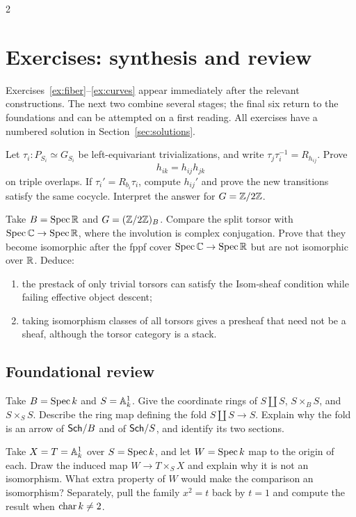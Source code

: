 \documentclass[12pt]{memoir}
\begin{document}
\begin{multicols}{2}
\section{Exercises: synthesis and review}\label{sec:exercises}

Exercises~\ref{ex:fiber}--\ref{ex:curves} appear immediately after the
relevant constructions. The next two combine several stages; the final
six return to the foundations and can be attempted on a first reading.
All exercises have a numbered solution in Section~\ref{sec:solutions}.

\begin{Ej}\label{ex:change}
Let $\tau_i:P_{S_i}\simeq G_{S_i}$ be left-equivariant trivializations,
and write $\tau_j\tau_i^{-1}=R_{h_{ij}}$. Prove
\[
 h_{ik}=h_{ij}h_{jk}
\]
on triple overlaps. If $\tau_i'=R_{b_i}\tau_i$, compute $h_{ij}'$ and
prove the new transitions satisfy the same cocycle. Interpret the
answer for $G=\mathbb{Z}/2\mathbb{Z}$.
\end{Ej}
\begin{Ej}\label{ex:forget}
Take $B=\operatorname{Spec}\mathbb{R}$ and $G=(\mathbb{Z}/2\mathbb{Z})_B$. Compare the split torsor
with $\operatorname{Spec}\mathbb{C}\to\operatorname{Spec}\mathbb{R}$, where the involution is complex
conjugation. Prove that they become isomorphic after the fppf cover
$\operatorname{Spec}\mathbb{C}\to\operatorname{Spec}\mathbb{R}$ but are not isomorphic over $\mathbb{R}$. Deduce:
\begin{enumerate}[label=(\alph*)]
\item the prestack of only trivial torsors can satisfy the Isom-sheaf
condition while failing effective object descent;
\item taking isomorphism classes of all torsors gives a presheaf that
need not be a sheaf, although the torsor category is a stack.
\end{enumerate}
\end{Ej}

\subsection{Foundational review}
\begin{Ej}\label{ex:coproducts}
Take $B=\operatorname{Spec} k$ and $S=\mathbb{A}^1_k$. Give the coordinate rings of
$S\amalg S$, $S\times_B S$, and $S\times_S S$. Describe the ring
map defining the fold $S\amalg S\to S$. Explain why the fold is an
arrow of $\mathsf{Sch}/B$ and of $\mathsf{Sch}/S$, and identify its two sections.
\end{Ej}

\begin{Ej}\label{ex:universalmap}
Take $X=T=\mathbb{A}^1_k$ over $S=\operatorname{Spec} k$, and let $W=\operatorname{Spec} k$ map to
the origin of each. Draw the induced map $W\to T\times_S X$ and
explain why it is not an isomorphism. What extra property of $W$
would make the comparison an isomorphism? Separately, pull the family
$x^2=t$ back by $t=1$ and compute the result when $\operatorname{char} k\ne2$.
\end{Ej}


\end{multicols}
\end{document}
